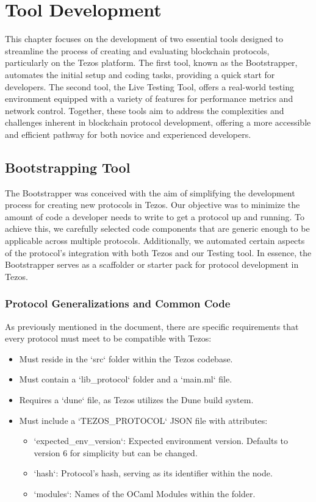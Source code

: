 \chapter{Tool Development}
This chapter focuses on the development of two essential tools designed to streamline the process of creating and evaluating blockchain protocols, particularly on the Tezos platform. The first tool, known as the Bootstrapper, automates the initial setup and coding tasks, providing a quick start for developers. The second tool, the Live Testing Tool, offers a real-world testing environment equipped with a variety of features for performance metrics and network control. Together, these tools aim to address the complexities and challenges inherent in blockchain protocol development, offering a more accessible and efficient pathway for both novice and experienced developers.


\section{Bootstrapping Tool}
The Bootstrapper was conceived with the aim of simplifying the development process for creating new protocols in Tezos. Our objective was to minimize the amount of code a developer needs to write to get a protocol up and running. To achieve this, we carefully selected code components that are generic enough to be applicable across multiple protocols. Additionally, we automated certain aspects of the protocol's integration with both Tezos and our Testing tool. In essence, the Bootstrapper serves as a scaffolder or starter pack for protocol development in Tezos.

\subsection{Protocol Generalizations and Common Code}

As previously mentioned in the document, there are specific requirements that every protocol must meet to be compatible with Tezos:

\begin{itemize}
\item Must reside in the `src` folder within the Tezos codebase.
\item Must contain a `lib\_protocol` folder and a `main.ml` file.
\item Requires a `dune` file, as Tezos utilizes the Dune build system.
\item Must include a `TEZOS\_PROTOCOL` JSON file with attributes:
\begin{itemize}
  \item `expected\_env\_version`: Expected environment version. Defaults to version 6 for simplicity but can be changed.
  \item `hash`: Protocol's hash, serving as its identifier within the node.
  \item `modules`: Names of the OCaml Modules within the folder.
\end{itemize}

\end{itemize}

